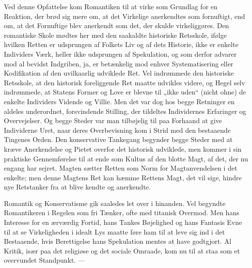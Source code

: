 \documentclass[12pt,a4paper,openany]{book}
\newcommand{\opage}[1]{\marginnote{\footnotesize\textit{[#1]}}}
\begin{document}
Ved denne Opfattelse kom Romantiken til at virke som Grundlag
for en Reaktion, der brød sig mere om, at det Virkelige anerkendtes
som fornuftigt, end om, at det Fornuftige blev anerkendt som det,
der skulde virkeliggøres. Den romantiske Skole mødtes her med den
saakaldte historiske Retsskole, ifølge hvilken Retten er udsprungen
af Folkets Liv og af dets Historie, ikke er enkelte Individers Værk,
heller ikke udsprungen af Spekulation, og som derfor advarer mod
al bevidst Indgriben, ja, er betænkelig mod enhver Systematisering
eller Kodifikation af den uvilkaarlig udviklede Ret. Vel indrømmede
den historiske Retsskole, at den historisk foreliggende Ret maatte
udvikles videre, og Hegel selv indrømmede, at Statens Former og
Love er blevne til „ikke uden“ (nicht ohne) de enkelte Individers
Vidende og Villie. Men det var dog hos begge Retninger en aldeles
underordnet, forsvindende Stilling, der tildeltes Individernes Erfaringer
og Overvejelser. Og begge Steder var man tilbøjelig til paa
Forhaand at give Individerne Uret, naar deres Overbevisning kom
i Strid med den bestaaende Tingenes Orden. Den konservative Tankegang
begynder begge Steder med at kræve Anerkendelse og Pietet
overfor det historisk udviklede, men kommer i sin praktiske Gennemførelse
til at ende som Kultus af den blotte Magt, af det, der nu
engang har sejret. Magten sætter Retten som Norm for Magtanvendelsen
i det enkelte; men denne Magtens Ret kan hæmme Rettens
\opage{14}Magt, det vil sige, hindre nye Retstanker fra at blive kendte og anerkendte.


Romantik og Konservatisme gik saaledes let over i hinanden. Vel
begyndte Romantikeren i Regelen som fri Tænker, ofte med titanisk
Overmod. Men hans Interesse for en ærværdig Fortid, hans Tankes
Bøjelighed og hans Fantasis Evne til at se Virkeligheden i idealt Lys
maatte føre ham til at leve sig ind i det Bestaaende, hvis Berettigelse
hans Spekulation mentes at have godtgjort. Al Kritik, især paa det
religiøse og det sociale Omraade, kom nu til at staa som et overvundet
Standpunkt. ---
\end{document}
